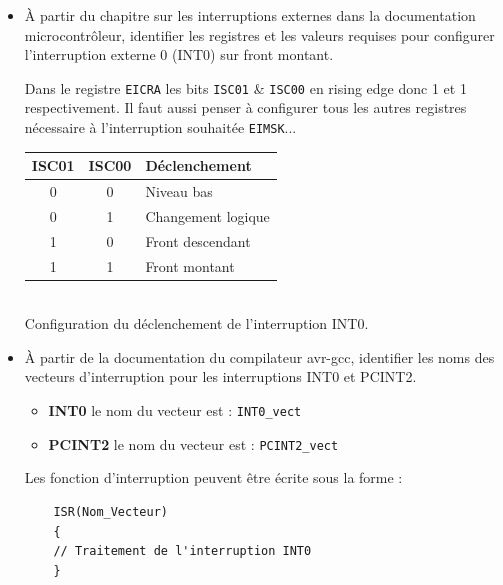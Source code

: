 \documentclass[a4paper,11pt]{article}
\begin{document}
\begin{itemize}
\begin{solution}
    \end{solution}

    \item À partir du chapitre sur les interruptions externes dans la documentation microcontrôleur, identifier les registres et les valeurs requises pour configurer l'interruption externe 0 (INT0) sur front montant.
    \begin{solution}
    Dans le registre \texttt{EICRA} les bits \texttt{ISC01} \&  \texttt{ISC00} en rising edge donc 1 et 1 respectivement. Il faut aussi penser à configurer tous les autres registres nécessaire à l'interruption souhaitée \texttt{EIMSK}...\\

    \centering
    \begin{tabular}{|c|c|l|} \hline 
    \textbf{ISC01} & \textbf{ISC00} & \textbf{Déclenchement} \\ \hline
        0 & 0 & Niveau bas \\ \hline 
        0 & 1 & Changement logique \\ \hline
        1 & 0 & Front descendant \\ \hline
        1 & 1 & Front montant \\ \hline
    \end{tabular} \\
    Configuration du déclenchement de l'interruption INT0.
    
    \end{solution}

    \item À partir de la documentation du compilateur avr-gcc, identifier les noms des vecteurs d'interruption pour les interruptions INT0 et PCINT2.
    \begin{solution}
    
    \begin{itemize}
        \item \textbf{INT0}  le nom du vecteur est : \texttt{INT0\_vect}
        \item \textbf{PCINT2} le nom du vecteur est : \texttt{PCINT2\_vect}
    \end{itemize}
    
    Les fonction d'interruption peuvent être écrite sous la forme : 
    \begin{verbatim} 
    ISR(Nom_Vecteur) 
    {
    // Traitement de l'interruption INT0 
    } 
    \end{verbatim}
    
    \end{solution}
\end{itemize}
\end{document}
